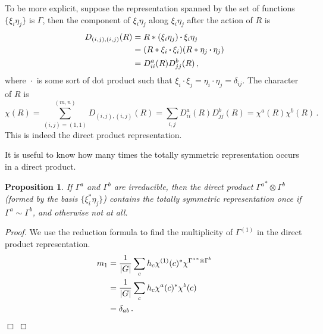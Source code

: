 \documentclass{article}
\theoremstyle{plain}\theoremheaderfont{\normalfont\itshape}\theorembodyfont{\rmfamily}\theoremseparator{.}\newtheorem*{rem}{Remark}\newtheorem*{ex}{Example}\newtheorem*{proof}{Proof}\newtheorem*{altp}{Alternative proof}
\theoremstyle{plain}\theoremheaderfont{\normalfont\bfseries}\theorembodyfont{\rmfamily}\theoremseparator{.}\newtheorem{thm}{Theorem}[section]\newtheorem{lem}[thm]{Lemma}\newtheorem{prop}[thm]{Proposition}\newtheorem*{cor}{Corollary}\newtheorem{defn}[thm]{Definition}\newtheorem{clm}[thm]{Claim}\newtheorem{clminproof}{Claim}\newtheorem*{law}{Law}\newtheorem{pos}[thm]{Postulate}
\theoremstyle{break}\theoremheaderfont{\normalfont\itshape}\theorembodyfont{\rmfamily}\theoremseparator{.\medskip}\newtheorem*{proofskip}{Proof}\newtheorem*{exs}{Examples}\newtheorem*{rems}{Remarks}
\theoremstyle{break}\theoremheaderfont{\normalfont\bfseries}\theorembodyfont{\rmfamily}\theoremseparator{.\medskip}\newtheorem{lemskip}[thm]{Lemma}\newtheorem{defnskip}[thm]{Definition}\newtheorem{propskip}[thm]{Proposition}\newtheorem{thmskip}[thm]{Theorem}
\numberwithin{equation}{section}
\newcommand{\qed}{\hfill\ensuremath{\Box}}
\newcommand{\vdot}{\,\bm{\mathrm{\cdot}}\,}
\newcommand{\abs}[1]{\left| #1 \right|}
\begin{document}
    To be more explicit, suppose the representation spanned by the set of functions \(\{\xi_i\eta_j\}\) is \(\Gamma\), then the component of \(\xi_i\eta_j\) along \(\xi_i\eta_j\) after the action of \(R\) is
    \begin{align}
        D_{(i,j),(i,j)}(R)&=R*(\xi_i\eta_j)\vdot \xi_i\eta_j \notag\\
        &=(R*\xi_i\vdot \xi_i)(R*\eta_j\vdot\eta_j) \notag\\
        &=D_{ii}^{a}(R) D_{jj}^{b}(R)\,,
    \end{align}
    where \(\vdot\) is some sort of dot product such that \(\xi_i\vdot\xi_j=\eta_i\vdot\eta_j=\delta_{ij}\). The character of \(R\) is
    \begin{equation}
        \chi(R)=\sum_{(i,j)=(1,1)}^{(m,n)}D_{(i,j),(i,j)}(R)=\sum_{i,j}D_{ii}^{a}(R)D_{jj}^{b}(R)=\chi^a(R)\chi^b(R)\,.
    \end{equation}
    This is indeed the direct product representation.

    It is useful to know how many times the totally symmetric representation occurs in a direct product.
    \begin{prop}
        If \(\Gamma^a\) and \(\Gamma^b\) are irreducible, then the direct product \({\Gamma^a}^*\otimes\Gamma^b\) (formed by the basis \(\{\xi_i^*\eta_j\}\)) contains the totally symmetric representation once if \(\Gamma^a\sim\Gamma^b\), and otherwise not at all.
    \end{prop}
    \begin{proof}
        We use the reduction formula to find the multiplicity of \(\Gamma^{(1)}\) in the direct product representation.
        \begin{align}
            m_1&=\frac{1}{\abs{G}}\sum_c h_c\chi^{(1)}(c)^*\chi^{{\Gamma^a}^*\otimes\Gamma^b}\notag \\
            &=\frac{1}{\abs{G}}\sum_c h_c\chi^{a}(c)^*\chi^{b}(c) \notag \\
            &=\delta_{ab}\,.
        \end{align}\qed
    \end{proof}
\end{document}
